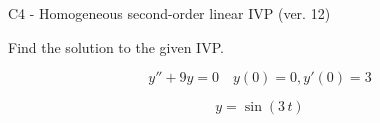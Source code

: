 \begin{exercise}
  \begin{exerciseTitle}C4 - Homogeneous second-order linear IVP (ver. 12)\end{exerciseTitle}
  \begin{exerciseStatement}
    
Find the solution to the given IVP.

    
\[y''+9y = 0 \hspace{1em} y(0) = 0 , y'(0) = 3\]

  \end{exerciseStatement}
  \begin{exerciseAnswer}
    
\[y= \sin\left(3 \, t\right)\]

  \end{exerciseAnswer}
\end{exercise}